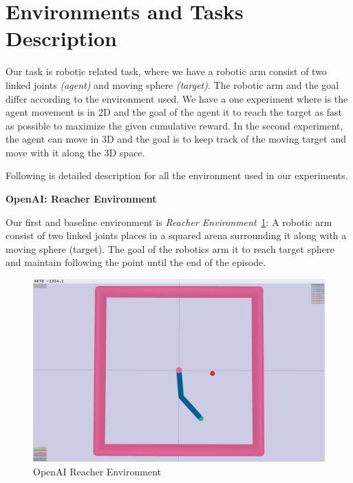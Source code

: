 \section{Environments and Tasks Description}
Our task is robotic related task, where we have a robotic arm consist of two linked joints \textit{(agent)} and moving sphere \textit{(target)}. The robotic arm and the goal differ according to the environment used. We have a one experiment where is the agent movement is in 2D and the goal of the agent it to reach the target as fast as possible to maximize the given cumulative reward. In the second experiment, the agent can move in 3D and the goal is to keep track of the moving target and move with it along the 3D space.

Following is detailed description for all the environment used in our experiments.

\textbf{OpenAI: Reacher Environment}

Our first and baseline environment is \textit{Reacher Environment}~\ref{fig:openai_reacher}: A robotic arm consist of two linked joints places in a squared arena surrounding it along with a moving sphere (target). The goal of the robotics arm it to reach target sphere and maintain following the point until the end of the episode. 

\begin{figure}[H]
    \begin{center}
            \includegraphics[width=0.7\linewidth]{figures/envs/openai_roboreacher.png}
            \caption{OpenAI Reacher Environment}
            \label{fig:openai_reacher}
    \end{center}
\end{figure}

